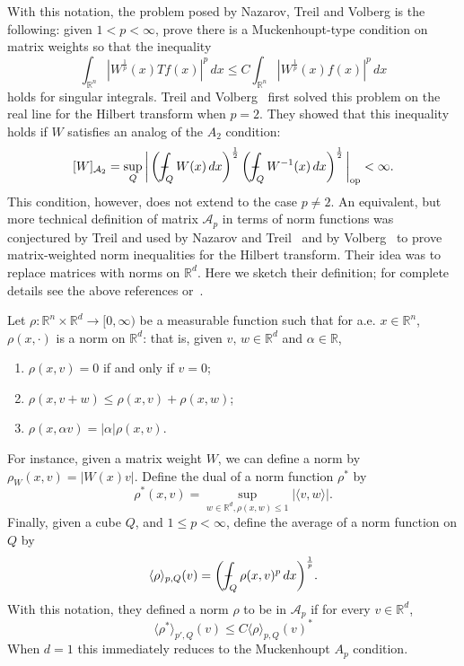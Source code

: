 \documentclass[12pt]{amsart}
\theoremstyle{definition}
\theoremstyle{remark}
\numberwithin{equation}{section}
\newcommand{\R}{\mathbb R}
\newcommand{\rn}{{{\mathbb R}^n}}
\newcommand{\rd}{{{\mathbb R}^d}}
\DeclareMathOperator{\op}{op}
\newcommand{\A}{\mathcal A}
\def\Xint#1{\mathchoice
   {\XXint\displaystyle\textstyle{#1}}%
   {\XXint\textstyle\scriptstyle{#1}}%
   {\XXint\scriptstyle\scriptscriptstyle{#1}}%
   {\XXint\scriptscriptstyle\scriptscriptstyle{#1}}%
   \!\int}
\def\XXint#1#2#3{{\setbox0=\hbox{$#1{#2#3}{\int}$}
     \vcenter{\hbox{$#2#3$}}\kern-.5\wd0}}
\def\avgint{\Xint-}
\begin{document}
With this notation, the problem posed by Nazarov, Treil and Volberg is
the following:  given $1<p<\infty$, prove there is a Muckenhoupt-type
condition on matrix weights so that the inequality
%
%
\[ \int_{\R^n} |W^{\frac{1}{p}}(x)T{f}(x)|^p \,dx
  \leq C \int_{\R^n} |W^{\frac{1}{p}}(x){f} (x)|^p \,dx \]
%
holds for singular integrals.    Treil and Volberg~\cite{MR1428818}  first
solved this problem on the real line for the Hilbert transform  when
$p=2$.  They showed that this inequality holds if $W$ satisfies an analog of the $A_2$
condition:
%
\begin{equation} \label{eqn:matrix-A2}
[W]_{\A_2} =
  \sup_Q \bigg| \left(\avgint_Q W(x)\,dx\right)^{\frac{1}{2}}
  \left(\avgint_Q W^{-1}(x)\,dx\right)^{\frac{1}{2}}\bigg|_{\op}
  <\infty. 
\end{equation}
% 
This condition, however, does not extend to the case $p\neq 2$.  An
equivalent, but more technical definition of matrix $\A_p$ in terms of
norm functions was
conjectured by Treil and used by Nazarov and Treil~\cite{MR1428988}
and by Volberg~\cite{MR1423034} to prove matrix-weighted norm
inequalities for the Hilbert transform.  Their idea was to replace
matrices with norms on $\rd $.  Here we sketch their definition; for
complete details see the above references or~\cite{mb-2022}.

Let  $\rho : \rn \times \rd 
\rightarrow [0,\infty)$ be a measurable function such that for
a.e. $x\in \rn$, $\rho(x,\cdot)$ is a norm on $\rd $:  that is, given
$v,\,w\in \rd$ and $\alpha \in \R$,
%
\begin{enumerate}
\item $\rho(x,v)=0$ if and only if $v=0$;
\item $\rho(x,v+w) \leq \rho(x,v)+\rho(x,w)$;
\item $\rho(x,\alpha v)=|\alpha|\rho(x,v)$. 
\end{enumerate}
%
For instance, given a matrix weight $W$, we can define a norm by
$\rho_W(x,v)=|W(x)v|$. 
Define the dual of a norm function $\rho^*$ by
%
\[ \rho^*(x,v) = \sup_{w\in \rd , \rho(x,w)\leq 1} |\langle v,
  w\rangle|. \]
%
Finally, given a cube $Q$, and $1\leq p<\infty$, define the average of a
norm function on $Q$ by
%
\[ \langle \rho \rangle_{p,Q}(v)
  =
  \bigg(\avgint_Q \rho(x,v)^p\,dx\bigg)^{\frac1p}. \]
%
With this notation, they defined a norm $\rho$ to be in $\A_p$ if for
every $v\in \rd $,
%
\[  \langle \rho^* \rangle_{p',Q}(v)
  \leq
  C  \langle \rho \rangle_{p,Q}(v)^* \]
%
When $d=1$ this immediately reduces to the Muckenhoupt $A_p$
condition.  
\end{document}
